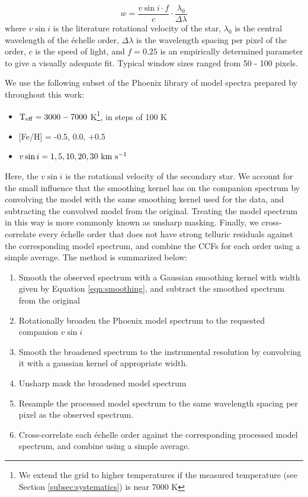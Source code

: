 \documentclass{emulateapj}
\begin{document}
\begin{equation}
w = \frac{v\sin{i} \cdot f}{c} \cdot \frac{\lambda_0}{\Delta \lambda}
\label{eqn:smoothing}
\end{equation}
where $v\sin{i}$ is the literature rotational velocity of the star, $\lambda_0$ is the central wavelength of the \'echelle order, $\Delta \lambda$ is the wavelength spacing per pixel of the order, $c$ is the speed of light, and $f = 0.25$ is an empirically determined parameter to give a visually adequate fit. Typical window sizes ranged from 50 - 100 pixels.

We use the following subset of the Phoenix library of model spectra prepared by \cite{Husser2013_b} throughout this work:

\begin{itemize}
\item $\rm T_{eff} = 3000-7000$ K\footnote{We extend the grid to higher temperatures if the measured temperature (see Section \ref{subsec:systematics}) is near 7000 K}, in steps of 100 K
\item {[}Fe/H{]} = -0.5, 0.0, +0.5
\item $v\sin{i} = 1, 5, 10, 20, 30 \ \rm km \ s^{-1}$
\end{itemize}
Here, the $v\sin{i}$ is the rotational velocity of the secondary star. We account for the small influence that the smoothing kernel has on the companion spectrum by convolving the model with the same smoothing kernel used for the data, and subtracting the convolved model from the original. Treating the model spectrum in this way is more commonly known as unsharp masking. Finally, we cross-correlate every \'echelle order that does not have strong telluric residuals against the corresponding model spectrum, and combine the CCFs for each order using a simple average. The method is summarized below:

\begin{enumerate}
 \item Smooth the observed spectrum with a Gaussian smoothing kernel with width given by Equation \ref{eqn:smoothing}, and subtract the smoothed spectrum from the original
 \item Rotationally broaden the Phoenix model spectrum to the requested companion $v\sin{i}$
 \item Smooth the broadened spectrum to the instrumental resolution by convolving it with a gaussian kernel of appropriate width.
 \item Unsharp mask the broadened model spectrum
 \item Resample the processed model spectrum to the same wavelength spacing per pixel as the observed spectrum.
 \item Cross-correlate each \'echelle order against the corresponding processed model spectrum, and combine using a simple average.
\end{enumerate}
\end{document}
